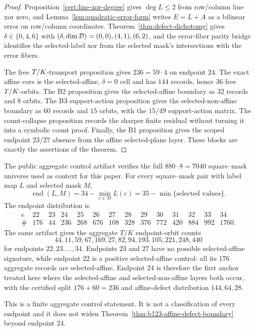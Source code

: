 \begin{proof}
Proposition~\ref{cert:line-xor-degree} gives \(\deg L\le2\) from row/column
line xor zero, and Lemma~\ref{lem:quadratic-error-form} writes \(E=L+A\) as a
bilinear error on row/column coordinates.  Theorem~\ref{thm:defect-dichotomy}
gives \(\delta\in\{0,4,6\}\) with
\((\delta,\dim\mathcal D)=(0,0),(4,1),(6,2)\), and the error-fiber parity bridge
identifies the selected-label xor from the selected mask's intersections with
the error fibers.

The free \(T/K\)-transport proposition gives \(236=59\cdot4\) on endpoint
\(24\).  The exact affine core is the selected-affine, \(\delta=0\) cell and
has \(144\) records, hence \(36\) free \(T/K\)-orbits.  The B2 proposition gives
the selected-affine boundary as \(32\) records and \(8\) orbits.  The B3
support-action proposition gives the selected-non-affine boundary as \(60\)
records and \(15\) orbits, with the \(15/49\) support-action matrix.  The
count-collapse proposition records the sharper finite residual without turning
it into a symbolic count proof.  Finally, the B1 proposition gives the scoped
endpoint \(23/27\) absence from the affine selected-plane layer.  These blocks
are exactly the assertions of the theorem.
\end{proof}

\begin{certprop}
\label{cert:full-endpoint-control}
The public aggregate control artifact verifies the full
\(880\cdot 8=7040\) square--mask universe used as context for this paper.  For
every square--mask pair with label map \(L\) and selected mask \(M\),
\[
  \operatorname{end}(L,M)=34-\min_{c\in M}L(c)
  =35-\min\{\text{selected values}\}.
\]
The endpoint distribution is
\[
\begin{array}{c|rrrrrrrrrrrrr}
 e&22&23&24&25&26&27&28&29&30&31&32&33&34\\\hline
 \#&176&44&236&268&676&108&328&376&772&420&884&992&1760.
\end{array}
\]
The same artifact gives the aggregate \(T/K\) endpoint-orbit counts
\[
44,11,59,67,169,27,82,94,193,105,221,248,440
\]
for endpoints \(22,23,\ldots,34\).  Endpoints \(23\) and \(27\) have no
possible selected-affine signature, while endpoint \(22\) is a positive
selected-affine control: all its \(176\) aggregate records are selected-affine.
Endpoint \(24\) is therefore the first anchor treated here where the
selected-affine and selected-non-affine layers both occur, with the certified
split \(176+60=236\) and affine-defect distribution \(144,64,28\).

This is a finite aggregate control statement.  It is not a classification of
every endpoint and it does not widen
Theorem~\ref{thm:b123-affine-defect-boundary} beyond endpoint \(24\).
\end{certprop}
